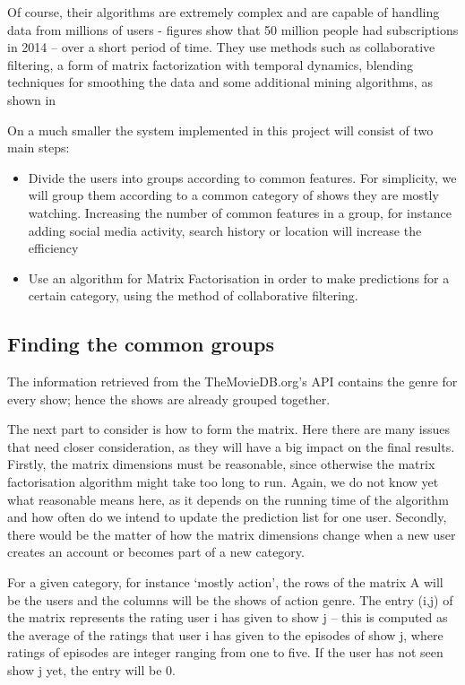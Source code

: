 Of course, their algorithms are extremely complex and are capable of handling data from millions of users - figures show that 50 million people had subscriptions in 2014 – over a short period of time. They use methods such as collaborative filtering, a form of matrix factorization with temporal dynamics, blending techniques for smoothing the data and some additional mining algorithms, as shown in \cite{np}

On a much smaller the system implemented in this project will consist of two main steps: 
\begin{itemize}
    \item Divide the users into groups according to common features. For simplicity, we will group them according to a common category of shows they are mostly watching. Increasing the number of common features in a group, for instance adding social media activity, search history or location will increase the efficiency
    \item Use an algorithm for Matrix Factorisation in order to make predictions for a certain category, using the method of collaborative filtering.
\end{itemize} 

\subsection{Finding the common groups}
The information retrieved from the TheMovieDB.org's API contains the genre for every show; hence the shows are already grouped together.

The next part to consider is how to form the matrix. Here there are many issues that need closer consideration, as they will have a big impact on the final results. Firstly, the matrix dimensions must be reasonable, since otherwise the matrix factorisation algorithm might take too long to run. Again, we do not know yet what reasonable means here, as it depends on the running time of the algorithm and how often do we intend to update the prediction list for one user. Secondly, there would be the matter of how the matrix dimensions change when a new user creates an account or becomes part of a new category.

For a given category, for instance ‘mostly action', the rows of the matrix A will be the users and the columns will be the shows of action genre. The entry (i,j) of the matrix represents the rating user i has given to show j – this is computed as the average of the ratings that user i has given to the episodes of show j, where ratings of episodes are integer ranging from one to five. If the user has not seen show j yet, the entry will be 0.


